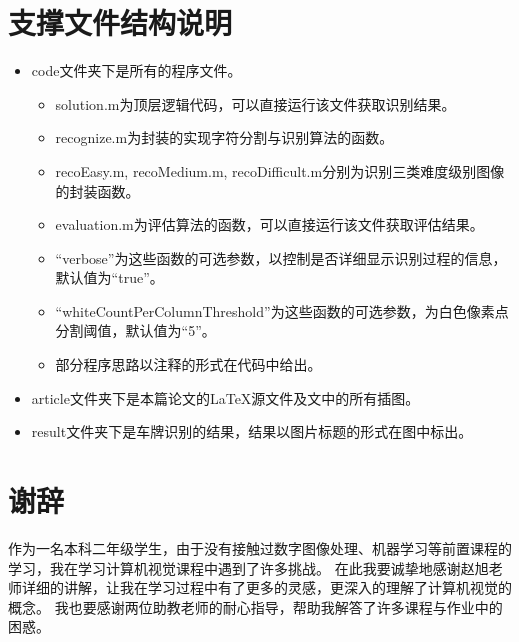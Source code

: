 \documentclass[utf8,a4paper]{ctexart}
\begin{document}
\begin{appendices}
    \section{支撑文件结构说明}
    \begin{itemize}
        \item code文件夹下是所有的程序文件。
              \begin{itemize}
                  \item solution.m为顶层逻辑代码，可以直接运行该文件获取识别结果。
                  \item recognize.m为封装的实现字符分割与识别算法的函数。
                  \item recoEasy.m, recoMedium.m, recoDifficult.m分别为识别三类难度级别图像的封装函数。
                  \item evaluation.m为评估算法的函数，可以直接运行该文件获取评估结果。
                  \item ``verbose''为这些函数的可选参数，以控制是否详细显示识别过程的信息，默认值为``true''。
                  \item ``whiteCountPerColumnThreshold''为这些函数的可选参数，为白色像素点分割阈值，默认值为``5''。
                  \item 部分程序思路以注释的形式在代码中给出。
              \end{itemize}
        \item article文件夹下是本篇论文的\LaTeX 源文件及文中的所有插图。
        \item result文件夹下是车牌识别的结果，结果以图片标题的形式在图中标出。
    \end{itemize}


    \section{谢辞}
    \begin{flushleft}

    \indent   作为一名本科二年级学生，由于没有接触过数字图像处理、机器学习等前置课程的学习，我在学习计算机视觉课程中遇到了许多挑战。
    在此我要诚挚地感谢赵旭老师详细的讲解，让我在学习过程中有了更多的灵感，更深入的理解了计算机视觉的概念。
    我也要感谢两位助教老师的耐心指导，帮助我解答了许多课程与作业中的困惑。
    \end{flushleft}
\end{appendices}
\end{document}
